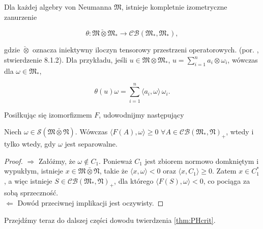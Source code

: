Dla każdej algebry von Neumanna $\mathfrak{M}$,
istnieje kompletnie izometryczne zanurzenie
\begin{linenomath*}
 \begin{equation}
\theta: \mathfrak{M} \check{\otimes} \mathfrak{M}_{*}\rightarrow
\mathcal{CB}(\mathfrak{M}_{*}, \mathfrak{M}_{*}),
 \end{equation}
\end{linenomath*}
gdzie $\check{\otimes}$ oznacza iniektywny iloczyn tensorowy przestrzeni operatorowych.
(por. \cite{Effros2000}, stwierdzenie 8.1.2).
Dla przykładu, jeśli
$u \in \mathfrak{M} \otimes \mathfrak{M}_{*}$, $u = \sum_{i = 1}^{n} a_{i} \otimes \omega_{i}$,
wówczas dla $\omega \in \mathfrak{M}_{*}$,
\begin{linenomath*}
 \begin{equation}
\theta(u)\omega = \sum_{i=1}^{n} \langle a_{i} , \omega \rangle \, \omega_{i}.
 \end{equation}
\end{linenomath*}
Posiłkując się izomorfizmem $F$,
udowodnijmy następujący
\begin{Lemma}
\label{prop:34523}
Niech $\omega\in \mathcal{S}(\mathfrak{M} \bar{\otimes} \mathfrak{N})$.
Wówczas $\langle F(A),\omega\rangle\geq 0$ $\forall A\in
\mathcal{CB}(\mathfrak{M}_*,\mathfrak{N})_+$,
wtedy i tylko wtedy, gdy $\omega$ jest separowalne.
\end{Lemma}
\begin{proof}
$\Rightarrow$ Załóżmy, że $\omega\notin C_1$.
Ponieważ $C_1$ jest zbiorem normowo domkniętym i wypukłym,
istnieje $x \in \mathfrak{M} \bar{\otimes} \mathfrak{N}$,
takie że $\langle x, \omega\rangle<0$ oraz $\langle x,C_1\rangle\geq 0$.
Zatem $x\in C_1^*$, a więc istnieje $S \in \mathcal{CB}(\mathfrak{M}_*,\mathfrak{N})_+$,
dla którego $\langle F(S),\omega\rangle<0$, co pociąga za sobą sprzeczność.\\
$\Leftarrow$ Dowód przeciwnej implikacji jest oczywisty.
\end{proof}

Przejdźmy teraz do dalszej części dowodu twierdzenia \ref{thm:PHcrit}.

